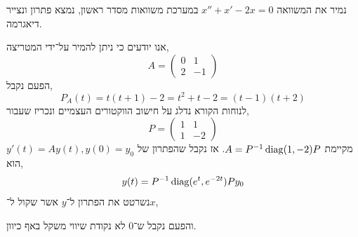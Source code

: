 \subquestion{}
נמיר את המשוואה $x'' + x' - 2x = 0$ במערכת משוואות מסדר ראשון, נמצא פתרון ונצייר דיאגרמה.
\begin{solution}
	אנו יודעים כי ניתן להמיר על־ידי המטריצה,
	\[
		A = \begin{pmatrix}
			0 & 1 \\
			2 & -1
		\end{pmatrix}
	\]
	הפעם נקבל,
	\[
		P_A(t)
		= t (t + 1) - 2
		= t^2 + t - 2
		= (t - 1)(t + 2)
	\]
	לנוחות הקורא נדלג על חישוב הווקטורים העצמיים ונכריז שעבור,
	\[
		P = \begin{pmatrix}
			1 & 1 \\
			1 & -2
		\end{pmatrix}
	\]
	מקיימת $A = P^{-1} \operatorname{diag}(1, -2) P$.
	אז נקבל שהפתרון של $y'(t) = A y(t), y(0) = y_0$ הוא,
	\[
		y(t)
		= P^{-1} \operatorname{diag}(e^t, e^{-2t}) P y_0
	\]
	נשרטט את הפתרון ל־$y$ אשר שקול ל־$x$,
	\begin{otherlanguage}{english}
		\begin{center}
		\end{center}
	\end{otherlanguage}
	והפעם נקבל ש־$0$ לא נקודת שיווי משקל באף כיוון.
\end{solution}


